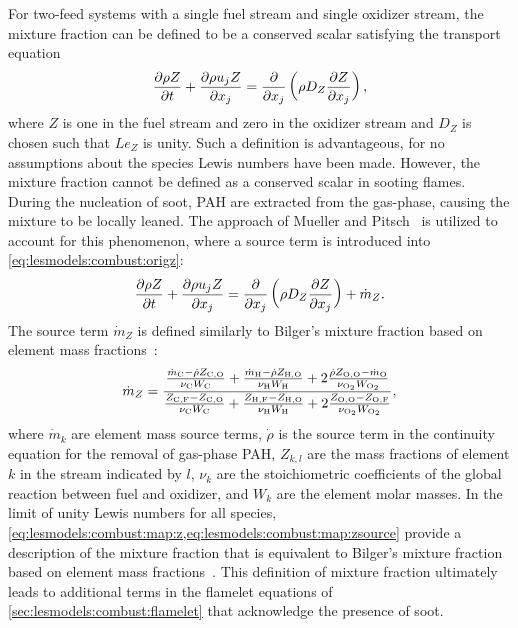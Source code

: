 For two-feed systems with a single fuel stream and single oxidizer stream, the mixture fraction can be defined to be a conserved scalar satisfying the transport equation~\cite{pitsch1998}
\begin{equation}\label{eq:lesmodels:combust:origz}
\trder{Z} = \pder[]{x_j}\left( \rho D_Z \pder[Z]{x_j} \right),
\end{equation}
where $Z$ is one in the fuel stream and zero in the oxidizer stream and $D_Z$ is chosen such that $Le_Z$ is unity. Such a definition is advantageous, for no assumptions about the species Lewis numbers have been made. However, the mixture fraction cannot be defined as a conserved scalar in sooting flames. During the nucleation of soot, PAH are extracted from the gas-phase, causing the mixture to be locally leaned. The approach of Mueller and Pitsch~\cite{mueller2012} is utilized to account for this phenomenon, where a source term is introduced into \cref{eq:lesmodels:combust:origz}:
\begin{equation}\label{eq:lesmodels:combust:map:z}
  \trder{Z} = \pder[]{x_j}\left( \rho D_Z \pder[Z]{x_j} \right) + \dot{m}_Z.
\end{equation}
The source term $\dot{m}_Z$ is defined similarly to Bilger's mixture fraction based on element mass fractions~\cite{bilger1989,mueller2012}:
\begin{equation}\label{eq:lesmodels:combust:map:zsource}
  \dot{m}_Z = \frac{\frac{\dot{m}_{\ce{C}} - \dot{\rho}Z_{\ce{C},\ce{O}}}{\nu_{\ce{C}}W_{\ce{C}}} + \frac{\dot{m}_{\ce{H}} - \dot{\rho}Z_{\ce{H},\ce{O}}}{\nu_{\ce{H}}W_{\ce{H}}} + 2\frac{\dot{\rho}Z_{\ce{O},\ce{O}} - \dot{m}_{\ce{O}}}{\nu_{\ce{O2}}W_{\ce{O2}}}}{\frac{Z_{\ce{C},\ce{F}} - Z_{\ce{C},\ce{O}}}{\nu_{\ce{C}}W_{\ce{C}}} + \frac{Z_{\ce{H},\ce{F}} - Z_{\ce{H},\ce{O}}}{\nu_{\ce{H}}W_{\ce{H}}} + 2\frac{Z_{\ce{O},\ce{O}} - Z_{\ce{O},\ce{F}}}{\nu_{\ce{O2}}W_{\ce{O2}}}},
\end{equation}
where $\dot{m}_k$ are element mass source terms, $\dot{\rho}$ is the source term in the continuity equation for the removal of gas-phase PAH, $Z_{k,l}$ are the mass fractions of element $k$ in the stream indicated by $l$, $\nu_k$ are the stoichiometric coefficients of the global reaction between fuel and oxidizer, and $W_{k}$ are the element molar masses. In the limit of unity Lewis numbers for all species, \cref{eq:lesmodels:combust:map:z,eq:lesmodels:combust:map:zsource} provide a description of the mixture fraction that is equivalent to Bilger's mixture fraction based on element mass fractions~\cite{bilger1989}. This definition of mixture fraction ultimately leads to additional terms in the flamelet equations of \cref{sec:lesmodels:combust:flamelet} that acknowledge the presence of soot.


